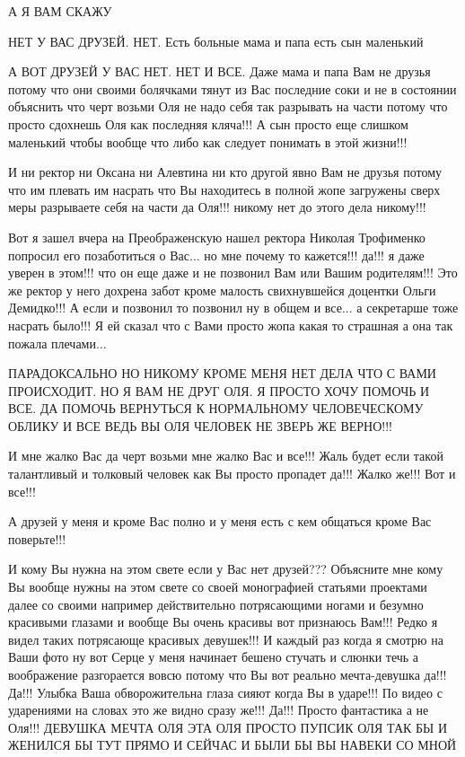 А Я ВАМ СКАЖУ

НЕТ У ВАС ДРУЗЕЙ. НЕТ. Есть больные мама и папа есть сын маленький

А ВОТ ДРУЗЕЙ У ВАС НЕТ. НЕТ И ВСЕ. Даже мама и папа Вам не друзья потому что
они своими болячками тянут из Вас последние соки и не в состоянии объяснить что
черт возьми Оля не надо себя так разрывать на части потому что просто сдохнешь
Оля как последняя кляча!!! А сын просто еще слишком маленький чтобы вообще
что либо как следует понимать в этой жизни!!!

И ни ректор ни Оксана ни Алевтина ни кто другой явно Вам не друзья
потому что им плевать им насрать что Вы находитесь в полной жопе загружены сверх
меры разрываете себя на части да Оля!!! никому нет до этого дела никому!!!

Вот я зашел вчера на Преображенскую нашел ректора Николая Трофименко попросил его позаботиться о Вас...
но мне почему то кажется!!! да!!! я даже уверен в этом!!! что он еще даже и не позвонил Вам или Вашим родителям!!!
Это же ректор у него дохрена забот кроме малость свихнувшейся доцентки Ольги Демидко!!!
А если и позвонил то позвонил ну в общем и все... а секретарше тоже насрать было!!!
Я ей сказал что с Вами просто жопа какая то страшная а она так пожала плечами...

ПАРАДОКСАЛЬНО НО НИКОМУ КРОМЕ МЕНЯ НЕТ ДЕЛА ЧТО С ВАМИ ПРОИСХОДИТ. 
НО Я ВАМ НЕ ДРУГ ОЛЯ. Я ПРОСТО ХОЧУ ПОМОЧЬ И ВСЕ.
ДА ПОМОЧЬ ВЕРНУТЬСЯ К НОРМАЛЬНОМУ ЧЕЛОВЕЧЕСКОМУ ОБЛИКУ И ВСЕ
ВЕДЬ ВЫ ОЛЯ ЧЕЛОВЕК НЕ ЗВЕРЬ ЖЕ ВЕРНО!!! 

И мне жалко Вас да черт возьми мне жалко Вас и все!!!
Жаль будет если такой талантливый и толковый человек как Вы просто пропадет да!!!
Жалко же!!! Вот и все!!!

А друзей у меня и кроме Вас полно и у меня есть с кем общаться
кроме Вас поверьте!!!

И кому Вы нужна на этом свете если у Вас нет друзей??? Объясните мне кому Вы
вообще нужны на этом свете со своей монографией статьями проектами далее со
своими например действительно потрясающими ногами и безумно красивыми глазами и
вообще Вы очень красивы вот признаюсь Вам!!! Редко я видел таких потрясающе
красивых девушек!!!  И каждый раз когда я смотрю на Ваши фото ну вот Серце у
меня начинает бешено стучать и слюнки течь а воображение разгорается вовсю
потому что Вы вот реально мечта-девушка да!!! Да!!! Улыбка Ваша обворожительна
глаза сияют когда Вы в ударе!!!  По видео с ударениями на словах это же видно
сразу же!!! Да!!!  Просто фантастика а не Оля!!! ДЕВУШКА МЕЧТА ОЛЯ ЭТА ОЛЯ ПРОСТО ПУПСИК ОЛЯ
ТАК БЫ И ЖЕНИЛСЯ БЫ ТУТ ПРЯМО И СЕЙЧАС И БЫЛИ БЫ ВЫ НАВЕКИ СО МНОЙ

